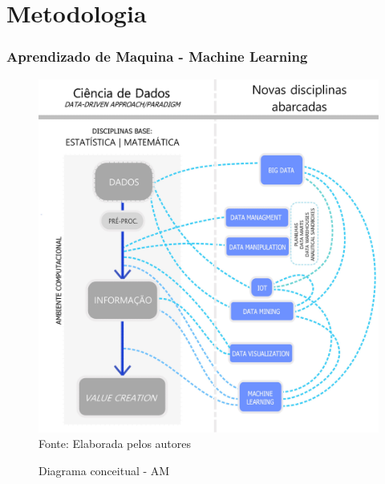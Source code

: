 \documentclass[11pt, aspectratio=169]{beamer}
\begin{document}
\section{Metodologia}


\begin{frame}
  \frametitle{Aprendizado de Maquina - Machine Learning}

  \begin{figure}[!htb]
    \centering
    \caption{Diagrama conceitual - AM}
    \includegraphics[height=.6\paperheight]{../Figures/ML/MAPA_conceitual_ciencia_de_dados_recorte.jpg}
    \\{\footnotesize Fonte: Elaborada pelos autores}
    \label{fig:diag_ml}
  \end{figure}

\end{frame}
\end{document}

